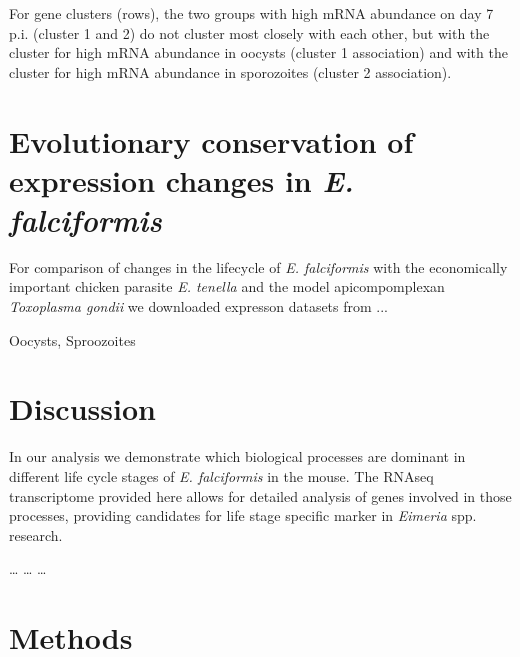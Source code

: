 \documentclass{bmcart}
\begin{document}
For gene clusters (rows), the two groups with high mRNA abundance on
day 7 p.i. (cluster 1 and 2) do not cluster most closely with each
other, but with the cluster for high mRNA abundance in oocysts
(cluster 1 association) and with the cluster for high mRNA abundance
in sporozoites (cluster 2 association).



\section*{Evolutionary conservation of expression changes in \textit{E. falciformis}}

For comparison of changes in the lifecycle of \textit{E. falciformis}
with the economically important chicken parasite \textit{E. tenella}
and the model apicompomplexan \textit{Toxoplasma gondii} we downloaded
expresson datasets from ...

Oocysts, Sproozoites 


\section*{Discussion}
In our analysis we demonstrate which biological processes are dominant
in different life cycle stages of \textit{E. falciformis} in the
mouse. The RNAseq transcriptome provided here allows for detailed
analysis of genes involved in those processes, providing candidates
for life stage specific marker in \textit{Eimeria} spp. research.

\ldots
\ldots
\ldots


\section{Methods}
\end{document}
